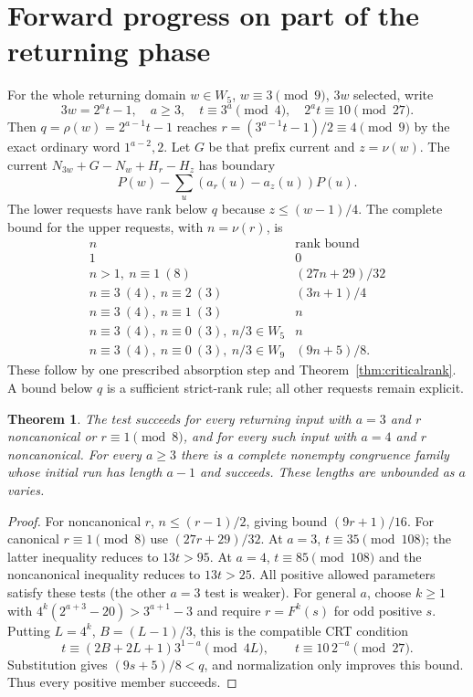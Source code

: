 \documentclass[11pt]{article}
\newtheorem{theorem}{Theorem}
\begin{document}
\section{Forward progress on part of the returning phase}
For the whole returning domain $w\in W_5$, $w\equiv3\pmod9$, $3w$
selected, write
\[
 3w=2^at-1,\quad a\ge3,\quad t\equiv3^a\pmod4,\quad
 2^at\equiv10\pmod{27}.
\]
Then $q=\rho(w)=2^{a-1}t-1$ reaches
$r=(3^{a-1}t-1)/2\equiv4\pmod9$ by the exact ordinary word
$1^{a-2},2$. Let $G$ be that prefix current and $z=\nu(w)$.
The current $N_{3w}+G-N_w+H_r-H_z$ has boundary
\[
 P(w)-\sum_u(a_r(u)-a_z(u))P(u).
\]
The lower requests have rank below $q$ because $z\le(w-1)/4$.
The complete bound for the upper requests, with $n=\nu(r)$, is
\[
\begin{array}{c|c}
 n&\text{rank bound}\\\hline
 1&0\\
 n>1,\ n\equiv1\ (8)&(27n+29)/32\\
 n\equiv3\ (4),\ n\equiv2\ (3)&(3n+1)/4\\
 n\equiv3\ (4),\ n\equiv1\ (3)&n\\
 n\equiv3\ (4),\ n\equiv0\ (3),\ n/3\in W_5&n\\
 n\equiv3\ (4),\ n\equiv0\ (3),\ n/3\in W_9&(9n+5)/8.
\end{array}
\]
These follow by one prescribed absorption step and
Theorem~\ref{thm:criticalrank}. A bound below $q$ is a sufficient
strict-rank rule; all other requests remain explicit.

\begin{theorem}\label{thm:returningforward}
The test succeeds for every returning input with $a=3$ and $r$
noncanonical or $r\equiv1\pmod8$, and for every such input with $a=4$
and $r$ noncanonical. For every $a\ge3$ there is a complete nonempty congruence family
whose initial run has length $a-1$ and succeeds. These lengths are
unbounded as $a$ varies.
\end{theorem}
\begin{proof}
For noncanonical $r$, $n\le(r-1)/2$, giving bound $(9r+1)/16$.
For canonical $r\equiv1\pmod8$ use $(27r+29)/32$.
At $a=3$, $t\equiv35\pmod{108}$; the latter inequality reduces to
$13t>95$. At $a=4$, $t\equiv85\pmod{108}$ and the noncanonical
inequality reduces to $13t>25$. All positive allowed parameters satisfy
these tests (the other $a=3$ test is weaker).
For general $a$, choose $k\ge1$ with
$4^k(2^{a+3}-20)>3^{a+1}-3$ and require $r=F^k(s)$ for odd positive $s$.
Putting $L=4^k$, $B=(L-1)/3$, this is the compatible CRT condition
\[
 t\equiv(2B+2L+1)3^{1-a}\pmod{4L},\qquad
 t\equiv10\,2^{-a}\pmod{27}.
\]
Substitution gives $(9s+5)/8<q$, and normalization only improves this
bound. Thus every positive member succeeds.
\end{proof}
\end{document}
